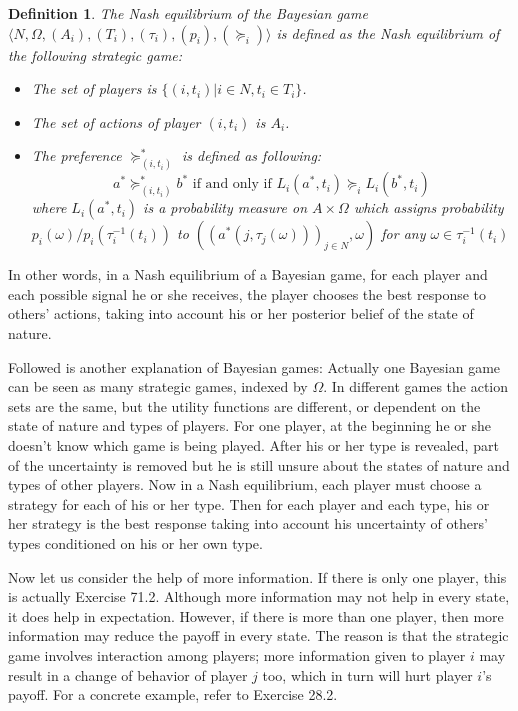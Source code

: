 \documentclass[openany]{book}
\newtheorem{definition}{Definition}[chapter]
\begin{document}
\begin{definition}
The Nash equilibrium of the Bayesian game $\langle N,\Omega,(A_i),(T_i),(\tau_i),(p_i),(\succeq_i)\rangle$ is defined as the Nash equilibrium of the following strategic game:
\begin{itemize}
\item The set of players is $\{(i,t_i)|i\in N,t_i\in T_i\}$.
\item The set of actions of player $(i,t_i)$ is $A_i$.
\item The preference $\succeq_{(i,t_i)}^*$ is defined as following:
$$a^*\succeq_{(i,t_i)}^*b^*\textrm{ if and only if }L_i(a^*,t_i)\succeq_iL_i(b^*,t_i)$$
where $L_i(a^*,t_i)$ is a probability measure on $A\times\Omega$ which assigns probability $p_i(\omega)/p_i(\tau_i^{-1}(t_i))$ to $((a^*(j,\tau_j(\omega)))_{j\in N},\omega)$ for any $\omega\in\tau_i^{-1}(t_i)$
\end{itemize}
\end{definition}
In other words, in a Nash equilibrium of a Bayesian game, for each player and each possible signal he or she receives, the player chooses the best response to others' actions, taking into account his or her posterior belief of the state of nature.

Followed is another explanation of Bayesian games: Actually one Bayesian game can be seen as many strategic games, indexed by $\Omega$. In different games the action sets are the same, but the utility functions are different, or dependent on the state of nature and types of players. For one player, at the beginning he or she doesn't know which game is being played. After his or her type is revealed, part of the uncertainty is removed but he is still unsure about the states of nature and types of other players. Now in a Nash equilibrium, each player must choose a strategy for each of his or her type. Then for each player and each type, his or her strategy is the best response taking into account his uncertainty of others' types conditioned on his or her own type.

Now let us consider the help of more information. If there is only one player, this is actually Exercise 71.2. Although more information may not help in every state, it does help in expectation. However, if there is more than one player, then more information may reduce the payoff in every state. The reason is that the strategic game involves interaction among players; more information given to player $i$ may result in a change of behavior of player $j$ too, which in turn will hurt player $i$'s payoff. For a concrete example, refer to Exercise 28.2.
\end{document}
